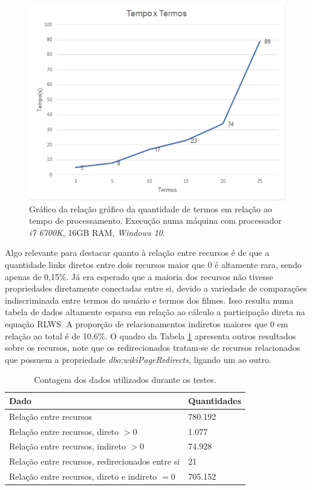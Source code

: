 \begin{figure}
	\centering
	\includegraphics[scale=0.85]{imagens/tempo_x_termos.jpg}
	\caption{Gráfico da relação gráfico da quantidade de termos em relação ao tempo de processamento. Execução numa máquina com processador \textit{i7 6700K}, 16GB RAM, \textit{Windows 10}.}
	\label{fig:tempo_x_termos}
\end{figure}

Algo relevante para destacar quanto à relação entre recursos é de que a quantidade links diretos entre dois recursos maior que 0 é altamente rara, sendo apenas de 0,15\%. Já era esperado que a maioria dos recursos não tivesse propriedades diretamente conectadas entre si, devido a variedade de comparações indiscriminada entre termos do usuário e termos dos filmes. Isso resulta numa tabela de dados altamente esparsa em relação ao cálculo a participação direta na equação \ac{RLWS}. A proporção de relacionamentos indiretos maiores que 0 em relação ao total é de 10,6\%. O quadro da Tabela \ref{tab:lod_cache_stats} apresenta outros resultados sobre os recursos, note que os redirecionados tratam-se de recursos relacionados que possuem a propriedade \textit{dbo:wikiPageRedirects}, ligando um ao outro.

\begin{table}[H]
\centering
\def\arraystretch{1.3}
\begin{tabular}{|l|l|}
\hline
\textbf{Dado}                                   & \textbf{Quantidades} \\ \hline
Relação entre recursos                          & 780.192              \\ \hline
Relação entre recursos, direto $> 0$ 			& 1.077                \\ \hline
Relação entre recursos, indireto $> 0$ 			& 74.928               \\ \hline
Relação entre recursos, redirecionados entre si & 21                   \\ \hline
Relação entre recursos, direto e indireto $= 0$ & 705.152              \\ \hline
\end{tabular}
\caption{Contagem dos dados utilizados durante os testes.}
\label{tab:lod_cache_stats}
\end{table}

